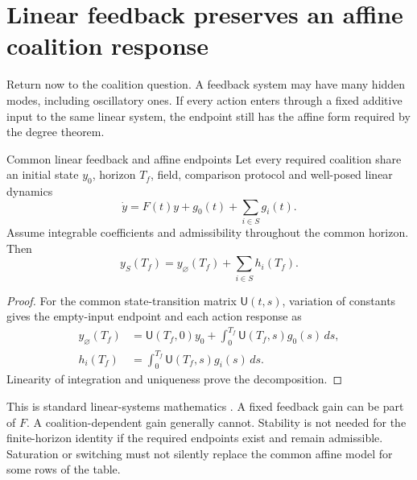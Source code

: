 \section{Linear feedback preserves an affine coalition response}
Return now to the coalition question. A feedback system may have many hidden modes, including oscillatory ones. If every action enters through a fixed additive input to the same linear system, the endpoint still has the affine form required by the degree theorem.

\begin{theorem}{Common linear feedback and affine endpoints}\label{thm:feedback-affine}
Let every required coalition share an initial state $y_0$, horizon $T_f$, field, comparison protocol and well-posed linear dynamics
\begin{equation}\label{eq:feedback-affine-law}
 \dot y=F(t)y+g_0(t)+\sum_{i\in S}g_i(t).
\end{equation}
Assume integrable coefficients and admissibility throughout the common horizon. Then
\begin{equation}\label{eq:feedback-affine-endpoint}
 y_S(T_f)=y_\varnothing(T_f)+\sum_{i\in S}h_i(T_f).
\end{equation}
\end{theorem}
\begin{proof}
For the common state-transition matrix $\mathsf U(t,s)$, variation of constants gives the empty-input endpoint and each action response as
\begin{align}
 y_\varnothing(T_f)&=\mathsf U(T_f,0)y_0+
  \int_0^{T_f}\mathsf U(T_f,s)g_0(s)\,ds,\nonumber\\
 h_i(T_f)&=\int_0^{T_f}\mathsf U(T_f,s)g_i(s)\,ds.
\end{align}
Linearity of integration and uniqueness prove the decomposition.
\end{proof}

This is standard linear-systems mathematics \cite{sontag,feedback-systems}. A fixed feedback gain can be part of $F$. A coalition-dependent gain generally cannot. Stability is not needed for the finite-horizon identity if the required endpoints exist and remain admissible. Saturation or switching must not silently replace the common affine model for some rows of the table.

